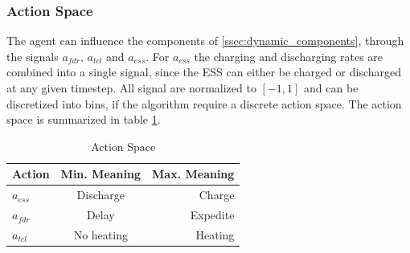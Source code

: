 \subsubsection{Action Space}
The agent can influence the components of \ref{ssec:dynamic_components}, through the signals $a_{fdr}$, $a_{tcl}$ and $a_{ess}$. For $a_{ess}$ the charging and discharging rates are combined into a single signal, since the ESS can either be charged or discharged at any given timestep. 
All signal are normalized to $[-1, 1]$ and can be discretized into bins, if the algorithm require a discrete action space. The action space is summarized in table \ref{tab:action_space}.
\begin{table}[H]
\label{tab:action_space}
\caption{Action Space}
\vskip 0.15in
\begin{center}
\begin{small}
\begin{sc}
\begin{tabular}{lcr}
\toprule
Action & Min. Meaning & Max. Meaning\\
\midrule
$a_{ess}$ & Discharge & Charge \\ 
    $a_{fdr}$ & Delay     & Expedite \\
    $a_{tcl}$ & No heating& Heating\\
\bottomrule
\end{tabular}
\end{sc}
\end{small}
\end{center}
\vskip -0.1in
\end{table}

